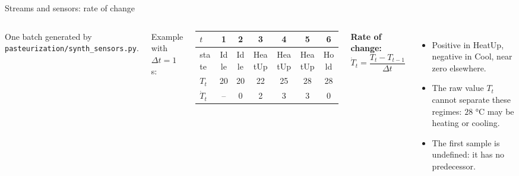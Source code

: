 \begin{frame}{Streams and sensors: rate of change}
\begin{columns}[T]
\centering
{}

{\tiny One batch generated by \texttt{pasteurization/synth\_sensors.py}.\par}
\vspace{0.3em}
\footnotesize Example with $\Delta t = 1$ s:\\[0.2em]
\begin{tabular}{l|cccccc}
$t$ & 1 & 2 & 3 & 4 & 5 & 6 \\
\hline
state & Idle & Idle & HeatUp & HeatUp & HeatUp & Hold \\
$T_t$ & 20 & 20 & 22 & 25 & 28 & 28 \\
$\dot{T}_t$ & -- & 0 & 2 & 3 & 3 & 0 \\
\end{tabular}
\footnotesize
\textbf{Rate of change:}
\[\dot{T}_t = \frac{T_t - T_{t-1}}{\Delta t}\]
\begin{itemize}
\item Positive in HeatUp, negative in Cool, near zero elsewhere.
\item The raw value $T_t$ cannot separate these regimes: $28$ °C may be heating or cooling.
\item The first sample is undefined: it has no predecessor.
\end{itemize}
\end{columns}
\coursefooter
\end{frame}
